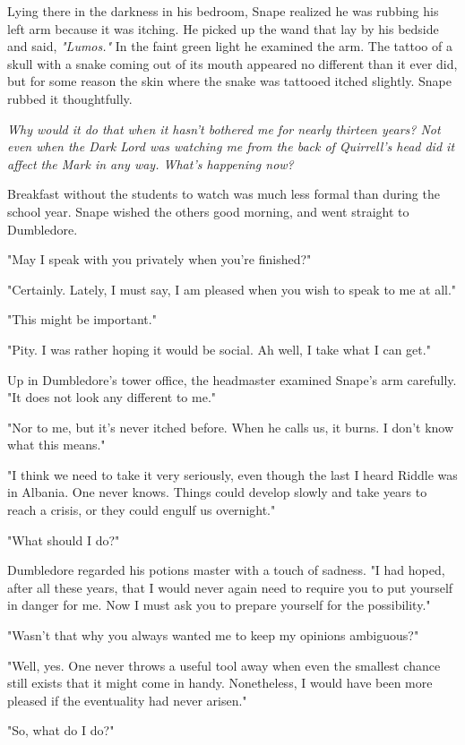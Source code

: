 Lying there in the darkness in his bedroom, Snape realized he was rubbing his left arm because it was itching. He picked up the wand that lay by his bedside and said, \emph{"Lumos."} In the faint green light he examined the arm. The tattoo of a skull with a snake coming out of its mouth appeared no different than it ever did, but for some reason the skin where the snake was tattooed itched slightly. Snape rubbed it thoughtfully.

\emph{Why would it do that when it hasn't bothered me for nearly thirteen years? Not even when the Dark Lord was watching me from the back of Quirrell's head did it affect the Mark in any way. What's happening now?}

Breakfast without the students to watch was much less formal than during the school year. Snape wished the others good morning, and went straight to Dumbledore.

"May I speak with you privately when you're finished?"

"Certainly. Lately, I must say, I am pleased when you wish to speak to me at all."

"This might be important."

"Pity. I was rather hoping it would be social. Ah well, I take what I can get."

Up in Dumbledore's tower office, the headmaster examined Snape's arm carefully. "It does not look any different to me."

"Nor to me, but it's never itched before. When he calls us, it burns. I don't know what this means."

"I think we need to take it very seriously, even though the last I heard Riddle was in Albania. One never knows. Things could develop slowly and take years to reach a crisis, or they could engulf us overnight."

"What should I do?"

Dumbledore regarded his potions master with a touch of sadness. "I had hoped, after all these years, that I would never again need to require you to put yourself in danger for me. Now I must ask you to prepare yourself for the possibility."

"Wasn't that why you always wanted me to keep my opinions{\el} ambiguous?"

"Well, yes. One never throws a useful tool away when even the smallest chance still exists that it might come in handy. Nonetheless, I would have been more pleased if the eventuality had never arisen."

"So, what do I do?"


